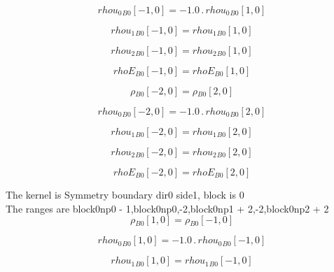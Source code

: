 \documentclass{article}
\begin{document}
\begin{dmath}{rhou_{0}{_{B0}}}[{-1,0}] = - 1.0 \,.\, {rhou_{0}{_{B0}}}[{1,0}]\end{dmath}

\begin{dmath}{rhou_{1}{_{B0}}}[{-1,0}] = {rhou_{1}{_{B0}}}[{1,0}]\end{dmath}

\begin{dmath}{rhou_{2}{_{B0}}}[{-1,0}] = {rhou_{2}{_{B0}}}[{1,0}]\end{dmath}

\begin{dmath}{rhoE{_{B0}}}[{-1,0}] = {rhoE{_{B0}}}[{1,0}]\end{dmath}

\begin{dmath}{\rho{_{B0}}}[{-2,0}] = {\rho{_{B0}}}[{2,0}]\end{dmath}

\begin{dmath}{rhou_{0}{_{B0}}}[{-2,0}] = - 1.0 \,.\, {rhou_{0}{_{B0}}}[{2,0}]\end{dmath}

\begin{dmath}{rhou_{1}{_{B0}}}[{-2,0}] = {rhou_{1}{_{B0}}}[{2,0}]\end{dmath}

\begin{dmath}{rhou_{2}{_{B0}}}[{-2,0}] = {rhou_{2}{_{B0}}}[{2,0}]\end{dmath}

\begin{dmath}{rhoE{_{B0}}}[{-2,0}] = {rhoE{_{B0}}}[{2,0}]\end{dmath}

\noindent The kernel is Symmetry boundary dir0 side1, block is 0\\\noindent The ranges are block0np0 - 1,block0np0,-2,block0np1 + 2,-2,block0np2 + 2\\\begin{dmath}{\rho{_{B0}}}[{1,0}] = {\rho{_{B0}}}[{-1,0}]\end{dmath}

\begin{dmath}{rhou_{0}{_{B0}}}[{1,0}] = - 1.0 \,.\, {rhou_{0}{_{B0}}}[{-1,0}]\end{dmath}

\begin{dmath}{rhou_{1}{_{B0}}}[{1,0}] = {rhou_{1}{_{B0}}}[{-1,0}]\end{dmath}
\end{document}
